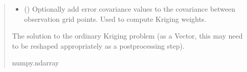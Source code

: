 \documentclass[letterpaper,10pt,english]{sphinxmanual}
\begin{document}
\begin{fulllineitems}
\begin{fulllineitems}
\begin{quote}
\begin{description}
\begin{itemize}
\item {}
\sphinxAtStartPar
{} (\sphinxstyleliteralemphasis{\sphinxupquote{ | }}) \textendash{} Optionally add error covariance values to the covariance between
observation grid points. Used to compute Kriging weights.

\end{itemize}

\sphinxAtStartPar
The solution to the ordinary Kriging problem (as a Vector, this may
need to be re\sphinxhyphen{}shaped appropriately as a post\sphinxhyphen{}processing step).

\sphinxAtStartPar
numpy.ndarray

\end{description}\end{quote}

\end{fulllineitems}


\end{fulllineitems}

\end{document}
